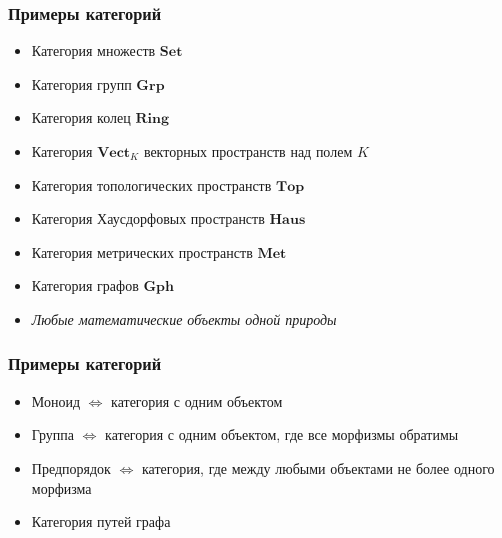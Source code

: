 \documentclass{beamer}
\begin{document}
\begin{frame}
\frametitle{Примеры категорий}
\begin{itemize}
\pause
\item Категория множеств \begin{math}\mathbf{Set}\end{math}
\pause
\item Категория групп \begin{math}\mathbf{Grp}\end{math}
\pause
\item Категория колец \begin{math}\mathbf{Ring}\end{math}
\pause
\item Категория \begin{math}\mathbf{Vect}_K\end{math} векторных пространств над полем \begin{math}K\end{math}
\pause
\item Категория топологических пространств \begin{math}\mathbf{Top}\end{math}
\pause
\item Категория Хаусдорфовых пространств \begin{math}\mathbf{Haus}\end{math}
\pause
\item Категория метрических пространств \begin{math}\mathbf{Met}\end{math}
\pause
\item Категория графов \begin{math}\mathbf{Gph}\end{math}
\pause
\item \textit{Любые математические объекты одной природы}
\end{itemize}
\end{frame}

\begin{frame}
\frametitle{Примеры категорий}
\begin{itemize}
\item Моноид \begin{math}\Leftrightarrow\end{math} категория с одним объектом
\item Группа \begin{math}\Leftrightarrow\end{math} категория с одним объектом, где все морфизмы обратимы
\item Предпорядок \begin{math}\Leftrightarrow\end{math} категория, где между любыми объектами не более одного морфизма
\item Категория путей графа
\end{itemize}
\end{frame}
\end{document}

